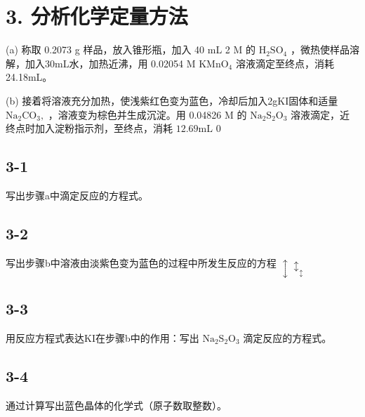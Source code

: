 \section*{3. 分析化学定量方法}
(a) 称取 0.2073 g 样品，放⼊锥形瓶，加⼊ 40 mL 2 M 的 $\mathrm { H _ { 2 } S O _ { 4 } }$ ，微热使样品溶解，加⼊30mL⽔，加热近沸，⽤ 0.02054 M $\mathrm { K M n O } _ { 4 }$ 溶液滴定⾄终点，消耗24.18mL。

(b) 接着将溶液充分加热，使浅紫红⾊变为蓝⾊，冷却后加⼊2gKI固体和适量 ${ \mathrm { N a } } _ { 2 } { \mathrm { C O } } _ { 3 } ,$ ，溶液变为棕⾊并⽣成沉淀。⽤ 0.04826 M 的 $\mathrm { N a _ { 2 } S _ { 2 } O _ { 3 } }$ 溶液滴定，近终点时加⼊淀粉指⽰剂，⾄终点，消耗 $1 2 . 6 9 \mathrm { m L }$ 0

\subsection*{3-1}
写出步骤a中滴定反应的⽅程式。

\subsection*{3-2}
写出步骤b中溶液由淡紫⾊变为蓝⾊的过程中所发⽣反应的⽅程 $\updownarrow \updownarrow _ { \updownarrow }$

\subsection*{3-3}
⽤反应⽅程式表达KI在步骤b中的作⽤：写出 $\mathrm { N a _ { 2 } S _ { 2 } O _ { 3 } }$ 滴定反应的⽅程式。

\subsection*{3-4}
通过计算写出蓝⾊晶体的化学式（原⼦数取整数）。
